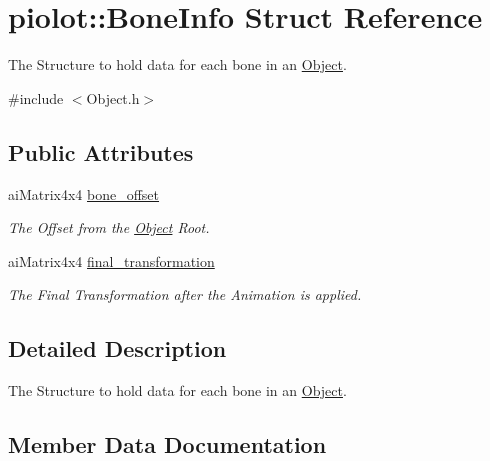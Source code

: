 \hypertarget{structpiolot_1_1_bone_info}{}\section{piolot\+:\+:Bone\+Info Struct Reference}
\label{structpiolot_1_1_bone_info}


The Structure to hold data for each bone in an \mbox{\hyperlink{classpiolot_1_1_object}{Object}}.  




{\ttfamily \#include $<$Object.\+h$>$}

\subsection*{Public Attributes}
\begin{DoxyCompactItemize}
\item 
ai\+Matrix4x4 \mbox{\hyperlink{structpiolot_1_1_bone_info_a522a75b933af6d94dbb2450373a6a330}{bone\+\_\+offset}}
\begin{DoxyCompactList}\small\item\em The Offset from the \mbox{\hyperlink{classpiolot_1_1_object}{Object}} Root. \end{DoxyCompactList}\item 
ai\+Matrix4x4 \mbox{\hyperlink{structpiolot_1_1_bone_info_a4b8952561f98ed8384fbed8b9103b7db}{final\+\_\+transformation}}
\begin{DoxyCompactList}\small\item\em The Final Transformation after the Animation is applied. \end{DoxyCompactList}\end{DoxyCompactItemize}


\subsection{Detailed Description}
The Structure to hold data for each bone in an \mbox{\hyperlink{classpiolot_1_1_object}{Object}}. 

\subsection{Member Data Documentation}
\mbox{\label{structpiolot_1_1_bone_info_a522a75b933af6d94dbb2450373a6a330}} 
